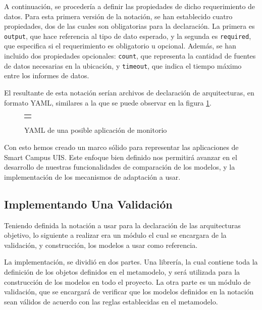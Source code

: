 A continuación, se procedería a definir las propiedades de dicho requerimiento de datos. Para esta primera versión de la notación, se han establecido cuatro propiedades, dos de las cuales son obligatorias para la declaración. La primera es \texttt{output}, que hace referencia al tipo de dato esperado, y la segunda es \texttt{required}, que especifica si el requerimiento es obligatorio u opcional. Además, se han incluido dos propiedades opcionales: \texttt{count}, que representa la cantidad de fuentes de datos necesarias en la ubicación, y \texttt{timeout}, que indica el tiempo máximo entre los informes de datos.

El resultante de esta notación serían archivos de declaración de arquitecturas, en formato YAML, similares a la que se puede observar en la figura \ref{fig:YAML-ADL}.

\begin{figure}[H]
    \centering
    \caption{YAML de una posible aplicación de monitorio}
    \label{fig:YAML-ADL}
    \begin{tabular}{c}
        \setstretch{1}
        \small
        
    \end{tabular}
\end{figure}

Con esto hemos creado un marco sólido para representar las aplicaciones de Smart Campus UIS. Este enfoque bien definido nos permitirá avanzar en el desarrollo de nuestras funcionalidades de comparación de los modelos, y la implementación de los mecanismos de adaptación a usar. 


\subsection{Implementando Una Validación}

Teniendo definida la notación a usar para la declaración de las arquitecturas objetivo, lo siguiente a realizar era un módulo el cual se encargara de la validación, y construcción, los modelos a usar como referencia. 

La implementación, se dividió en dos partes. Una librería, la cual contiene toda la definición de los objetos definidos en el metamodelo, y será utilizada para la construcción de los modelos en todo el proyecto. La otra parte es un módulo de validación, que se encargará de verificar que los modelos definidos en la notación sean válidos de acuerdo con las reglas establecidas en el metamodelo.

